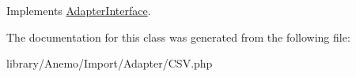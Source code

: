 Implements \hyperlink{interface_anemo_1_1_import_1_1_adapter_1_1_adapter_interface_a75416ddc6d147a0aaca83783f838403a}{AdapterInterface}.



The documentation for this class was generated from the following file:\begin{DoxyCompactItemize}
\item 
library/Anemo/Import/Adapter/CSV.php\end{DoxyCompactItemize}
